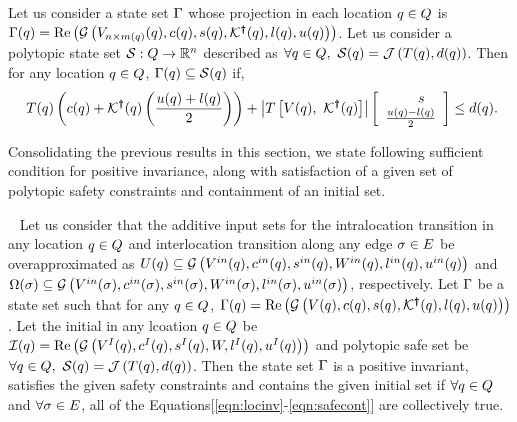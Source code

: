 \begin{lemma}
  Let us consider a state set $\Gamma$ whose projection in each
  location $q \in Q$ is $\Gamma(q) =
  \operatorname{\operatorname{Re}}\left(\mathcal{G}\left(V_{n\times
      m(q)}(q),c(q),s(q),\mathcal{K}^{\bm{\dagger}}(q),l(q),u(q)\right)\right)$.
  Let us consider a polytopic state set
  $\mathcal{S}:Q\rightarrow\mathbb{R}^n$ described as $\forall
  q\in Q,~\mathcal{S}(q)=\mathcal{J}\left(T(q),d(q)\right)$. Then
  for any location $q\in Q$, $\Gamma(q)\subseteq
  \mathcal{S}(q)$ if,
\begin{align}~\label{eqn:safecont}
T(q)\left(c(q)+\mathcal{K}^{\bm{\dagger}}(q)\left(\frac{u(q)+l(q)}{2}\right)\right)+\left|T\left[V(q),~\mathcal{K}^{\bm{\dagger}}(q)\right]\right|\left[\begin{array}{c}{\hspace{1.5em}s}\\{\frac{u(q)-l(q)}{2}} \end{array}\right]\leq d(q).
\end{align}
\end{lemma}
%
Consolidating the previous results in this section, we state following
sufficient condition for positive invariance, along with satisfaction
of a given set of polytopic safety constraints and containment of an initial set.
%
\begin{theorem}~\label{thm:main} Let us consider that the additive input sets for the intralocation
  transition in any location $q\in Q$ and interlocation
  transition along any edge $\sigma\in E$ be overapproximated as
  $U(q)\subseteq \mathcal{G}\left(V^{in}(q),c^{in}(q),s^{in}(q),W^{in}(q),l^{in}(q),u^{in}(q)\right)$
  and
  $\Omega(\sigma)\subseteq \mathcal{G}\left(V^{in}(\sigma),c^{in}(\sigma),s^{in}(\sigma),W^{in}(\sigma),l^{in}(\sigma),u^{in}(\sigma)\right)$,
  respectively.  Let $\Gamma$ be a state set such that for any
  $q\in Q$, $\Gamma(q)
  = \operatorname{\operatorname{Re}}\left(\mathcal{G}\left(V(q),c(q),s(q),\mathcal{K}^{\bm{\dagger}}(q),l(q),u(q)\right)\right)$.
  Let the initial in any lcoation $q\in Q$ be
  $\mathcal{I}(q)=\operatorname{\operatorname{Re}}\left(\mathcal{G}\left(V^I(q),c^I(q),s^I(q),W,l^I(q),u^I(q)\right)\right)$
  and polytopic safe set be
  $\forall q\in Q,~\mathcal{S}(q)=\mathcal{J}\left(T(q),d(q)\right)$.
  Then the state set $\Gamma$ is a positive invariant, satisfies
  the given safety constraints and contains the given initial set if
  $\forall q\in Q$ and $\forall \sigma\in E$, all of
  the Equations[\ref{eqn:locinv}-\ref{eqn:safecont}] are collectively
  true.
\end{theorem}

